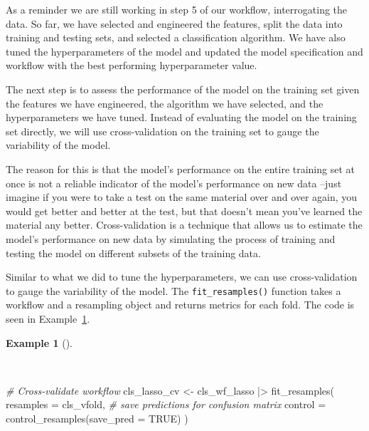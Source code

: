 \documentclass[
  letterpaper,
]{book}
\newenvironment{Shaded}{\begin{snugshade}}{\end{snugshade}}
\newcommand{\AttributeTok}[1]{\textcolor[rgb]{0.00,0.00,0.00}{#1}}
\newcommand{\CommentTok}[1]{\textcolor[rgb]{0.00,0.00,0.00}{\textit{#1}}}
\newcommand{\ConstantTok}[1]{\textcolor[rgb]{0.00,0.00,0.00}{#1}}
\newcommand{\FunctionTok}[1]{\textcolor[rgb]{0.00,0.00,0.00}{#1}}
\newcommand{\NormalTok}[1]{\textcolor[rgb]{0.00,0.00,0.00}{#1}}
\newcommand{\OtherTok}[1]{\textcolor[rgb]{0.00,0.00,0.00}{#1}}
\newcommand{\SpecialCharTok}[1]{\textcolor[rgb]{0.00,0.00,0.00}{#1}}
\theoremstyle{definition}
\newtheorem{example}{Example}[chapter]
\theoremstyle{remark}
\begin{document}
As a reminder we are still working in step 5 of our workflow,
interrogating the data. So far, we have selected and engineered the
features, split the data into training and testing sets, and selected a
classification algorithm. We have also tuned the hyperparameters of the
model and updated the model specification and workflow with the best
performing hyperparameter value.

The next step is to assess the performance of the model on the training
set given the features we have engineered, the algorithm we have
selected, and the hyperparameters we have tuned. Instead of evaluating
the model on the training set directly, we will use cross-validation on
the training set to gauge the variability of the model.

The reason for this is that the model's performance on the entire
training set at once is not a reliable indicator of the model's
performance on new data --just imagine if you were to take a test on the
same material over and over again, you would get better and better at
the test, but that doesn't mean you've learned the material any better.
Cross-validation is a technique that allows us to estimate the model's
performance on new data by simulating the process of training and
testing the model on different subsets of the training data.

Similar to what we did to tune the hyperparameters, we can use
cross-validation to gauge the variability of the model. The
\texttt{fit\_resamples()} function takes a workflow and a resampling
object and returns metrics for each fold. The code is seen in
Example~\ref{exm-predict-class-tune-hyperparameters-evaluate-workflow-cv}.

\begin{example}[]\protect\hypertarget{exm-predict-class-tune-hyperparameters-evaluate-workflow-cv}{}\label{exm-predict-class-tune-hyperparameters-evaluate-workflow-cv}

~

\begin{Shaded}
\begin{Highlighting}[]
\CommentTok{\# Cross{-}validate workflow}
\NormalTok{cls\_lasso\_cv }\OtherTok{\textless{}{-}}
\NormalTok{  cls\_wf\_lasso }\SpecialCharTok{|\textgreater{}}
  \FunctionTok{fit\_resamples}\NormalTok{(}
    \AttributeTok{resamples =}\NormalTok{ cls\_vfold,}
    \CommentTok{\# save predictions for confusion matrix}
    \AttributeTok{control =} \FunctionTok{control\_resamples}\NormalTok{(}\AttributeTok{save\_pred =} \ConstantTok{TRUE}\NormalTok{)}
\NormalTok{  )}
\end{Highlighting}
\end{Shaded}

\end{example}
\end{document}
